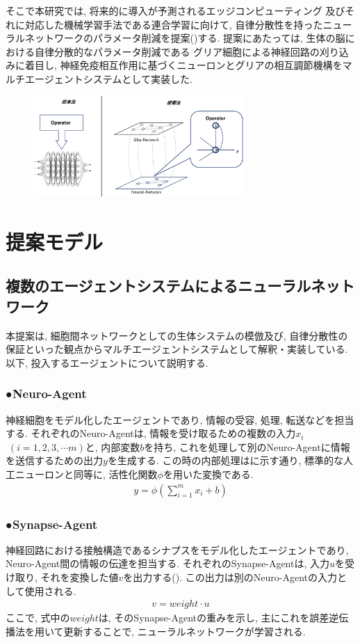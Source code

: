 \documentclass[a4paper,9pt,twocolumn]{jsarticle}
\begin{document}
そこで本研究では, 将来的に導入が予測されるエッジコンピューティング
及びそれに対応した機械学習手法である連合学習に向けて, 
自律分散性を持ったニューラルネットワークのパラメータ削減を提案()する.
提案にあたっては, 生体の脳における自律分散的なパラメータ削減である
グリア細胞による神経回路の刈り込みに着目し, 
神経免疫相互作用に基づくニューロンとグリアの相互調節機構をマルチエージェントシステムとして実装した.
\vspace{-1.5zh}
\begin{figure}[H]
  \centering
  \includegraphics[width=8cm]{ThisModel.pdf}
  \label{fig:ThisModel}
\end{figure}
\vspace{-4zh}
\section{提案モデル}
\subsection{複数のエージェントシステムによるニューラルネットワーク}
本提案は, 細胞間ネットワークとしての生体システムの模倣及び, 
自律分散性の保証といった観点からマルチエージェントシステムとして解釈・実装している.  
以下, 投入するエージェントについて説明する.
  \subsubsection*{●Neuro-Agent}
  神経細胞をモデル化したエージェントであり, 情報の受容, 処理, 
  転送などを担当する.
  それぞれのNeuro-Agentは, 情報を受け取るための複数の入力$x_i$ $\;(i= 1, 2, 3, \cdots m)$と, 
  内部変数$b$を持ち, 
  これを処理して別のNeuro-Agentに情報を送信するための出力$y$を生成する.
  この時の内部処理はに示す通り, 
  標準的な人工ニューロンと同等に, 活性化関数$\phi$を用いた変換である.
  \begin{align}
    y=\phi(\sum_{i=1}^m x_i+b)
    \label{eq:Neuro-Agent}
  \end{align}
  \subsubsection*{●Synapse-Agent}
  神経回路における接触構造であるシナプスをモデル化したエージェントであり, 
  Neuro-Agent間の情報の伝達を担当する.
  それぞれのSynapse-Agentは, 入力$u$を受け取り, それを変換した値$v$を出力する(). 
  この出力は別のNeuro-Agentの入力として使用される.
  \begin{align}
    v=weight\cdot u
 \label{eq:Synapse-Agent}   
  \end{align}
  ここで, 式中の$weight$は, そのSynapse-Agentの重みを示し, 
  主にこれを誤差逆伝播法を用いて更新することで, ニューラルネットワークが学習される.
\end{document}
